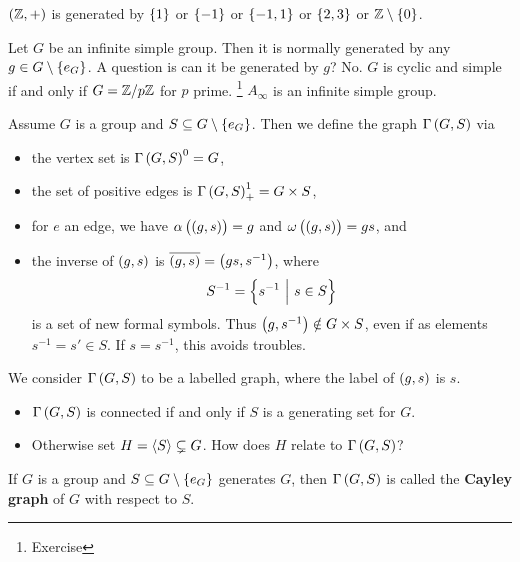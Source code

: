 \begin{example}
$ \br{\ZZ, +} $ is generated by $ \cbr{1} $ or $ \cbr{-1} $ or $ \cbr{-1, 1} $ or $ \cbr{2, 3} $ or $ \ZZ \setminus \cbr{0} $.
\end{example}

\pagebreak

\begin{example}
Let $ G $ be an infinite simple group. Then it is normally generated by any $ g \in G \setminus \cbr{e_G} $. A question is can it be generated by $ g $? No. $ G $ is cyclic and simple if and only if $ G = \mathbb{Z} / p\mathbb{Z} $ for $ p $ prime. \footnote{Exercise} $ A_\infty $ is an infinite simple group.
\end{example}


\begin{definition}
Assume $ G $ is a group and $ S \subseteq G \setminus \cbr{e_G} $. Then we define the graph $ \Gamma\br{G, S} $ via
\begin{itemize}
\item the vertex set is $ \Gamma\br{G, S}^0 = G $,
\item the set of positive edges is $ \Gamma\br{G, S}_+^1 = G \times S $,
\item for $ e $ an edge, we have $ \alpha\br{\br{g, s}} = g $ and $ \omega\br{\br{g, s}} = gs $, and
\item the inverse of $ \br{g, s} $ is $ \overline{\br{g, s}} = \br{gs, s^{-1}} $, where
$$ S^{-1} = \cbr{s^{-1} \st s \in S} $$
is a set of new formal symbols. Thus $ \br{g, s^{-1}} \notin G \times S $, even if as elements $ s^{-1} = s' \in S $. If $ s = s^{-1} $, this avoids troubles.
\end{itemize}
We consider $ \Gamma\br{G, S} $ to be a labelled graph, where the label of $ \br{g, s} $ is $ s $.
\end{definition}

\begin{exercise}
\hfill
\begin{itemize}
\item $ \Gamma\br{G, S} $ is connected if and only if $ S $ is a generating set for $ G $.
\item Otherwise set $ H = \left\langle S \right\rangle \subsetneq G $. How does $ H $ relate to $ \Gamma\br{G, S} $?
\end{itemize}
\end{exercise}

\begin{definition}
If $ G $ is a group and $ S \subseteq G \setminus \cbr{e_G} $ generates $ G $, then $ \Gamma\br{G, S} $ is called the \textbf{Cayley graph} of $ G $ with respect to $ S $.
\end{definition}

